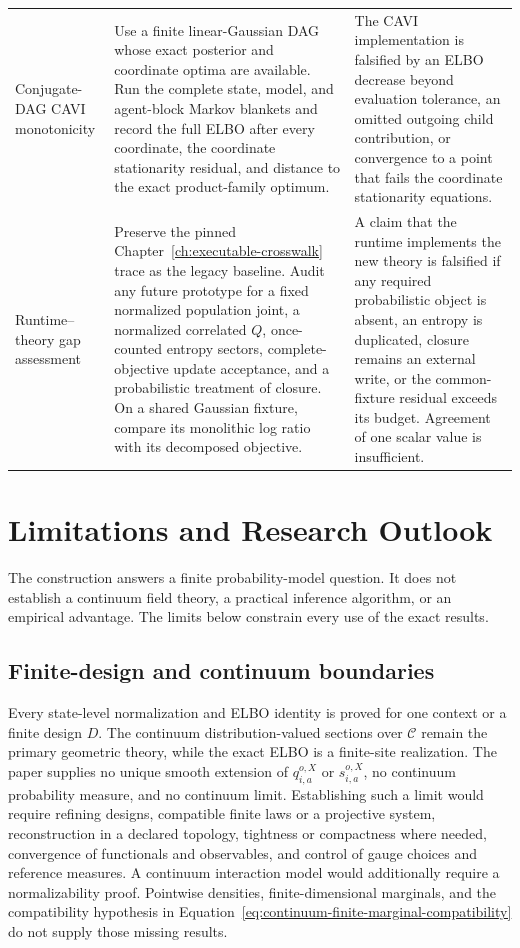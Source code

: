 \begin{longtable}{>{\raggedright\arraybackslash}p{}>{\raggedright\arraybackslash}p{}>{\raggedright\arraybackslash}p{}}
\addlinespace
Conjugate-DAG CAVI monotonicity & Use a finite linear-Gaussian DAG whose exact posterior and coordinate optima are available. Run the complete state, model, and agent-block Markov blankets and record the full ELBO after every coordinate, the coordinate stationarity residual, and distance to the exact product-family optimum. & The CAVI implementation is falsified by an ELBO decrease beyond evaluation tolerance, an omitted outgoing child contribution, or convergence to a point that fails the coordinate stationarity equations. \\
\addlinespace
Runtime--theory gap assessment & Preserve the pinned Chapter~\ref{ch:executable-crosswalk} trace as the legacy baseline. Audit any future prototype for a fixed normalized population joint, a normalized correlated \(Q\), once-counted entropy sectors, complete-objective update acceptance, and a probabilistic treatment of closure. On a shared Gaussian fixture, compare its monolithic log ratio with its decomposed objective. & A claim that the runtime implements the new theory is falsified if any required probabilistic object is absent, an entropy is duplicated, closure remains an external write, or the common-fixture residual exceeds its budget. Agreement of one scalar value is insufficient. \\
\end{longtable}
\normalsize

\chapter{Limitations and Research Outlook}
\label{ch:limitations}

The construction answers a finite probability-model question. It does not establish a continuum field theory, a practical inference algorithm, or an empirical advantage. The limits below constrain every use of the exact results.

\section{Finite-design and continuum boundaries}

Every state-level normalization and ELBO identity is proved for one context or a finite design \(D\). The continuum distribution-valued sections over \(\mathcal C\) remain the primary geometric theory, while the exact ELBO is a finite-site realization. The paper supplies no unique smooth extension of \(q_{i,a}^{o,X}\) or \(s_{i,a}^{o,X}\), no continuum probability measure, and no continuum limit. Establishing such a limit would require refining designs, compatible finite laws or a projective system, reconstruction in a declared topology, tightness or compactness where needed, convergence of functionals and observables, and control of gauge choices and reference measures. A continuum interaction model would additionally require a normalizability proof. Pointwise densities, finite-dimensional marginals, and the compatibility hypothesis in Equation~\eqref{eq:continuum-finite-marginal-compatibility} do not supply those missing results.

